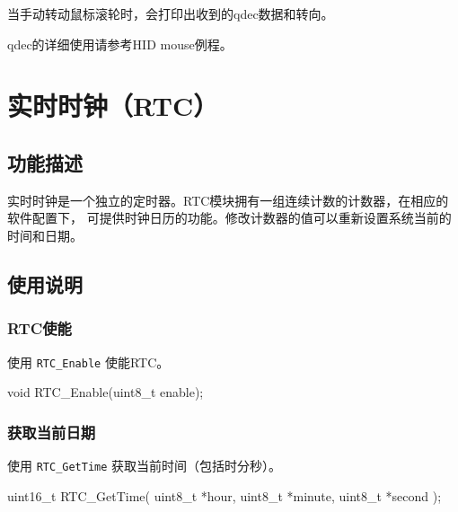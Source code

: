 \documentclass[
  12pt,
]{book}
\newenvironment{Shaded}{\begin{snugshade}}{\end{snugshade}}
\newcommand{\DataTypeTok}[1]{\textcolor[rgb]{0.13,0.29,0.53}{#1}}
\newcommand{\NormalTok}[1]{#1}
\begin{document}
当手动转动鼠标滚轮时，会打印出收到的qdec数据和转向。

qdec的详细使用请参考HID mouse例程。

\hypertarget{ch-rtc}{%
\chapter{实时时钟（RTC）}\label{ch-rtc}}

\hypertarget{ux529fux80fdux63cfux8ff0-6}{%
\section{功能描述}\label{ux529fux80fdux63cfux8ff0-6}}

实时时钟是一个独立的定时器。RTC模块拥有一组连续计数的计数器，在相应的软件配置下，
可提供时钟日历的功能。修改计数器的值可以重新设置系统当前的时间和日期。

\hypertarget{ux4f7fux7528ux8bf4ux660e-4}{%
\section{使用说明}\label{ux4f7fux7528ux8bf4ux660e-4}}

\hypertarget{rtcux4f7fux80fd}{%
\subsection{RTC使能}\label{rtcux4f7fux80fd}}

使用 \texttt{RTC\_Enable} 使能RTC。

\begin{Shaded}
\begin{Highlighting}[]
\DataTypeTok{void}\NormalTok{ RTC_Enable(}\DataTypeTok{uint8_t}\NormalTok{ enable);}
\end{Highlighting}
\end{Shaded}

\hypertarget{ux83b7ux53d6ux5f53ux524dux65e5ux671f}{%
\subsection{获取当前日期}\label{ux83b7ux53d6ux5f53ux524dux65e5ux671f}}

使用 \texttt{RTC\_GetTime} 获取当前时间（包括时分秒）。

\begin{Shaded}
\begin{Highlighting}[]
\DataTypeTok{uint16_t}\NormalTok{ RTC_GetTime(}
  \DataTypeTok{uint8_t}\NormalTok{ *hour, }
  \DataTypeTok{uint8_t}\NormalTok{ *minute, }
  \DataTypeTok{uint8_t}\NormalTok{ *second}
\NormalTok{  );}
\end{Highlighting}
\end{Shaded}
\end{document}
